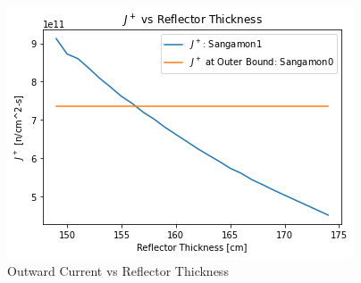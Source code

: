 \begin{figure}[h!]
\centering
\includegraphics{figures/jout-v-rdet.png}
\caption{Outward Current vs Reflector Thickness}
\label{fig:jvrdet}
\end{figure}